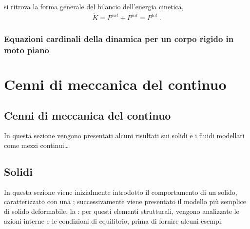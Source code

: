\documentclass[letterpaper,10pt,italian]{jupyterBook}
\begin{document}
\sphinxAtStartPar
si ritrova la forma generale del bilancio dell’energia cinetica,
\begin{equation*}
\begin{split}\dot{K} = P^{ext} + P^{int} = P^{tot} \ .\end{split}
\end{equation*}

\section{Equazioni cardinali della dinamica per un corpo rigido in moto piano}
\label{\detokenize{ch/mechanics/dynamics-notes:equazioni-cardinali-della-dinamica-per-un-corpo-rigido-in-moto-piano}}\label{\detokenize{ch/mechanics/dynamics-notes:physics-hs-mechanics-dynamics-eom-rigid-2d}}
\sphinxAtStartPar
{}

\sphinxstepscope


\part{Cenni di meccanica del continuo}

\sphinxstepscope


\chapter{Cenni di meccanica del continuo}
\label{\detokenize{ch/continuum/intro:cenni-di-meccanica-del-continuo}}\label{\detokenize{ch/continuum/intro:physics-hs-continuum}}\label{\detokenize{ch/continuum/intro::doc}}
\sphinxAtStartPar
In questa sezione vengono presentati alcuni risultati sui solidi e i fluidi modellati come mezzi continui…

\sphinxstepscope


\chapter{Solidi}
\label{\detokenize{ch/continuum/solids:solidi}}\label{\detokenize{ch/continuum/solids:continuum-solids}}\label{\detokenize{ch/continuum/solids::doc}}
\sphinxAtStartPar
In questa sezione viene inizialmente introdotto il comportamento di un solido, caratterizzato con una {\hyperref[\detokenize{ch/continuum/solids:contiuum-solids-mono-axial}]{}}; successivamente viene presentato il modello più semplice di solido deformabile, la : per questi elementi strutturali, vengono analizzate le azioni interne e le condizioni di equilibrio, prima di fornire alcuni esempi.
\end{document}
